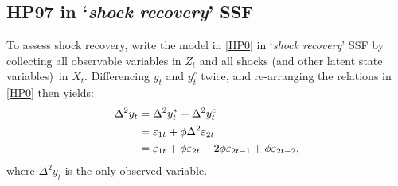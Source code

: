 \documentclass[a4paper,12pt]{article}
\begin{document}
\subsection{HP97 in `\emph{shock recovery}' SSF}

To assess shock recovery, write the model in \ref{HP0} in `\emph{shock
recovery}' SSF by collecting all observable variables in $Z_{t}$ and all
shocks (and other latent state variables)\ in $X_{t}$. Differencing $y_{t}$
and $y_{t}^{c}$ twice, and re-arranging the relations in \ref{HP0} then
yields:%
\begin{align}
\Delta ^{2}y_{t}& =\Delta ^{2}y_{t}^{\ast }+\Delta ^{2}y_{t}^{c}  \notag \\
& =\varepsilon _{1t}+\phi \Delta ^{2}\varepsilon _{2t}  \notag \\
& =\varepsilon _{1t}+\phi \varepsilon _{2t}-2\phi \varepsilon _{2t-1}+\phi
\varepsilon _{2t-2},  \label{Z}
\end{align}%
where $\Delta ^{2}y_{t}$ is the only observed variable.
\end{document}
